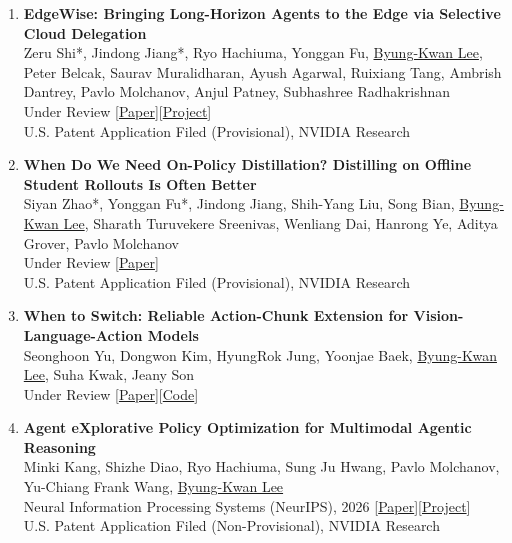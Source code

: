 \documentclass[a4paper,11pt]{article}
\begin{document}
{\begin{enumerate}[leftmargin=2.2em, labelsep=0.6em, align=left, itemindent=0em, label={\color{accentDark}\textbf{\arabic*.}}]
\item \textbf{EdgeWise: Bringing Long-Horizon Agents to the Edge via Selective Cloud Delegation}
\\\vspace{1mm}Zeru Shi*, Jindong Jiang*, Ryo Hachiuma, Yonggan Fu, \underline{Byung-Kwan Lee}, Peter Belcak, Saurav Muralidharan, Ayush Agarwal, Ruixiang Tang, Ambrish Dantrey, Pavlo Molchanov, Anjul Patney, Subhashree Radhakrishnan
\\\vspace{2mm}Under Review [\href{https://arxiv.org/abs/2610.17560}{Paper}][\href{https://research.nvidia.com/labs/lpr/edge-wise/}{Project}]
\\\vspace{2mm}U.S. Patent Application Filed (Provisional), NVIDIA Research

\item \textbf{When Do We Need On-Policy Distillation? Distilling on Offline Student Rollouts Is Often Better}
\\\vspace{1mm}Siyan Zhao*, Yonggan Fu*, Jindong Jiang, Shih-Yang Liu, Song Bian, \underline{Byung-Kwan Lee}, Sharath Turuvekere Sreenivas, Wenliang Dai, Hanrong Ye, Aditya Grover, Pavlo Molchanov
\\\vspace{2mm}Under Review [\href{https://arxiv.org/abs/2610.11291}{Paper}]
\\\vspace{2mm}U.S. Patent Application Filed (Provisional), NVIDIA Research

\item \textbf{When to Switch: Reliable Action-Chunk Extension for Vision-Language-Action Models}
\\\vspace{1mm}Seonghoon Yu, Dongwon Kim, HyungRok Jung, Yoonjae Baek, \underline{Byung-Kwan Lee}, Suha Kwak, Jeany Son
\\\vspace{2mm}Under Review [\href{https://arxiv.org/abs/2610.05719}{Paper}][\href{https://github.com/Seonghoon-Yu/RACE-VLA}{Code}]

\item \textbf{Agent eXplorative Policy Optimization for Multimodal Agentic Reasoning}
\\\vspace{1mm}Minki Kang, Shizhe Diao, Ryo Hachiuma, Sung Ju Hwang, Pavlo Molchanov, Yu-Chiang Frank Wang, \underline{Byung-Kwan Lee}
\\\vspace{2mm}Neural Information Processing Systems (NeurIPS), 2026 [\href{https://arxiv.org/abs/2605.28774}{Paper}][\href{https://byungkwanlee.github.io/AXPO-page/}{Project}]
\\\vspace{2mm}U.S. Patent Application Filed (Non-Provisional), NVIDIA Research


\end{enumerate}}
\end{document}
